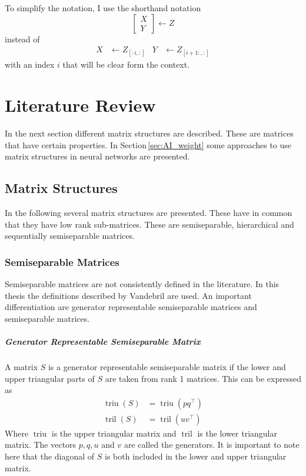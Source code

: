 \documentclass[numbers=noenddot,doctype=mastersthesis,BCOR=15mm,biblatex]{ldvbook}%
\DeclareMathOperator{\triu}{triu}
\DeclareMathOperator{\tril}{tril}
\begin{document}
To simplify the notation, I use the shorthand notation 
\begin{equation}
	\begin{bmatrix}
	X\\Y 
	\end{bmatrix}
	\gets
	Z
\end{equation}
instead of
\begin{align}
	X&\gets Z_{[:i,:]} & Y& \gets Z_{[i+1:,:]}
\end{align}
with an index $i$ that will be clear form the context.


\chapter{Literature Review}\label{chap:lit}
In the next section different matrix structures are described.
These are matrices that have certain properties.
In Section\,\ref{sec:AI_weight} some approaches to use matrix structures in neural networks are presented.




\section{Matrix Structures}\label{sec:mat_structures}
In the following several matrix structures are presented.
These have in common that they have low rank sub-matrices.
These are semiseparable, hierarchical and sequentially semiseparable matrices.

\subsection{Semiseparable Matrices}
Semiseparable matrices are not consistently defined in the literature. 
In this thesis the definitions described by Vandebril \cite{vandebril_bibliography_2005,vandebril_matrix_2007} are used.
An important differentiation are generator representable semiseparable matrices and semiseparable matrices.
\paragraph{Generator Representable Semiseparable Matrix}
A matrix $S$ is a generator representable semiseparable matrix if the lower and upper triangular parts of $S$ are taken from rank 1 matrices.
This can be expressed as 
\begin{align}
	\triu(S) &= \triu(pq^\top)\\
	\tril(S) &= \tril(uv^\top)
\end{align}
Where $\triu$ is the upper triangular matrix and $\tril$ is the lower triangular matrix. The vectors $p,q,u$ and $v$ are called the generators.
It is important to note here that the diagonal of $S$ is both included in the lower and upper triangular matrix.
\end{document}
